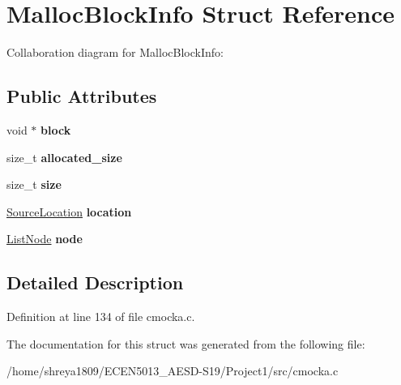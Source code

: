 \hypertarget{structMallocBlockInfo}{}\section{Malloc\+Block\+Info Struct Reference}
\label{structMallocBlockInfo}


Collaboration diagram for Malloc\+Block\+Info\+:
\subsection*{Public Attributes}
\begin{DoxyCompactItemize}
\item 
\mbox{\label{structMallocBlockInfo_aaca8b34ff6f79f4454bba197a21a52e7}} 
void $\ast$ {\bfseries block}
\item 
\mbox{\label{structMallocBlockInfo_a103783e0ba99bc5360f69c3b30a39048}} 
size\+\_\+t {\bfseries allocated\+\_\+size}
\item 
\mbox{\label{structMallocBlockInfo_a7d069f95b78b4e068752abc6277b786b}} 
size\+\_\+t {\bfseries size}
\item 
\mbox{\label{structMallocBlockInfo_af1a66bb07ef7e53441b7fca1c6c61906}} 
\hyperlink{structSourceLocation}{Source\+Location} {\bfseries location}
\item 
\mbox{\label{structMallocBlockInfo_ae4628c67b78874f1569ec84bf8978b91}} 
\hyperlink{structListNode}{List\+Node} {\bfseries node}
\end{DoxyCompactItemize}


\subsection{Detailed Description}


Definition at line 134 of file cmocka.\+c.



The documentation for this struct was generated from the following file\+:\begin{DoxyCompactItemize}
\item 
/home/shreya1809/\+E\+C\+E\+N5013\+\_\+\+A\+E\+S\+D-\/\+S19/\+Project1/src/cmocka.\+c\end{DoxyCompactItemize}
